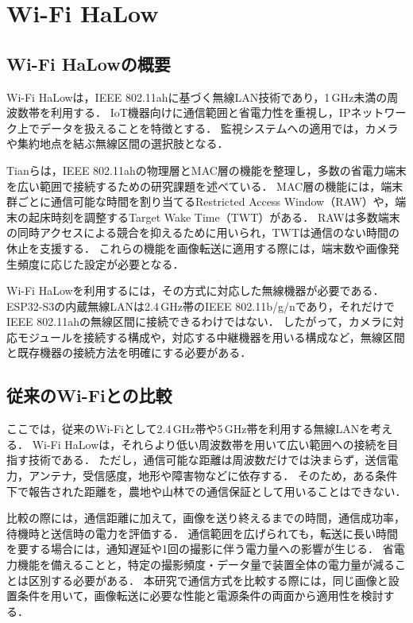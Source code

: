 \section{Wi-Fi HaLow}
\label{sec:background-halow}
\subsection{Wi-Fi HaLowの概要}
Wi-Fi HaLowは，IEEE 802.11ahに基づく無線LAN技術であり，1\,GHz未満の周波数帯を利用する．
IoT機器向けに通信範囲と省電力性を重視し，IPネットワーク上でデータを扱えることを特徴とする\cite{HaLowOverview,HaLowMM6108}．
監視システムへの適用では，カメラや集約地点を結ぶ無線区間の選択肢となる．

Tianら\cite{Tian2021}は，IEEE 802.11ahの物理層とMAC層の機能を整理し，多数の省電力端末を広い範囲で接続するための研究課題を述べている．
MAC層の機能には，端末群ごとに通信可能な時間を割り当てるRestricted Access Window（RAW）や，端末の起床時刻を調整するTarget Wake Time（TWT）がある．
RAWは多数端末の同時アクセスによる競合を抑えるために用いられ，TWTは通信のない時間の休止を支援する．
これらの機能を画像転送に適用する際には，端末数や画像発生頻度に応じた設定が必要となる．

Wi-Fi HaLowを利用するには，その方式に対応した無線機器が必要である．
ESP32-S3の内蔵無線LANは2.4\,GHz帯のIEEE 802.11b/g/nであり，それだけでIEEE 802.11ahの無線区間に接続できるわけではない\cite{ESP32S3,HaLowOverview}．
したがって，カメラに対応モジュールを接続する構成や，対応する中継機器を用いる構成など，無線区間と既存機器の接続方法を明確にする必要がある．

\subsection{従来のWi-Fiとの比較}
ここでは，従来のWi-Fiとして2.4\,GHz帯や5\,GHz帯を利用する無線LANを考える．
Wi-Fi HaLowは，それらより低い周波数帯を用いて広い範囲への接続を目指す技術である\cite{Tian2021,HaLowOverview}．
ただし，通信可能な距離は周波数だけでは決まらず，送信電力，アンテナ，受信感度，地形や障害物などに依存する．
そのため，ある条件下で報告された距離を，農地や山林での通信保証として用いることはできない．

比較の際には，通信距離に加えて，画像を送り終えるまでの時間，通信成功率，待機時と送信時の電力を評価する．
通信範囲を広げられても，転送に長い時間を要する場合には，通知遅延や1回の撮影に伴う電力量への影響が生じる．
省電力機能を備えることと，特定の撮影頻度・データ量で装置全体の電力量が減ることは区別する必要がある．
本研究で通信方式を比較する際には，同じ画像と設置条件を用いて，画像転送に必要な性能と電源条件の両面から適用性を検討する．
